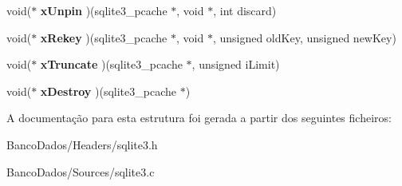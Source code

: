 \begin{DoxyCompactItemize}
\item 
\hypertarget{structsqlite3__pcache__methods_ade2ab50cc6896be03ee86541877fa85e}{void($\ast$ {\bfseries x\-Unpin} )(sqlite3\-\_\-pcache $\ast$, void $\ast$, int discard)}\label{structsqlite3__pcache__methods_ade2ab50cc6896be03ee86541877fa85e}

\item 
\hypertarget{structsqlite3__pcache__methods_adc5552190f1de86eb95d91e9cf8430e6}{void($\ast$ {\bfseries x\-Rekey} )(sqlite3\-\_\-pcache $\ast$, void $\ast$, unsigned old\-Key, unsigned new\-Key)}\label{structsqlite3__pcache__methods_adc5552190f1de86eb95d91e9cf8430e6}

\item 
\hypertarget{structsqlite3__pcache__methods_aad73f9335999770bcd2dc6a2d914b4f0}{void($\ast$ {\bfseries x\-Truncate} )(sqlite3\-\_\-pcache $\ast$, unsigned i\-Limit)}\label{structsqlite3__pcache__methods_aad73f9335999770bcd2dc6a2d914b4f0}

\item 
\hypertarget{structsqlite3__pcache__methods_aac18fc581d8d63550a6657016c24ba5d}{void($\ast$ {\bfseries x\-Destroy} )(sqlite3\-\_\-pcache $\ast$)}\label{structsqlite3__pcache__methods_aac18fc581d8d63550a6657016c24ba5d}

\end{DoxyCompactItemize}


A documentação para esta estrutura foi gerada a partir dos seguintes ficheiros\-:\begin{DoxyCompactItemize}
\item 
Banco\-Dados/\-Headers/sqlite3.\-h\item 
Banco\-Dados/\-Sources/sqlite3.\-c\end{DoxyCompactItemize}
